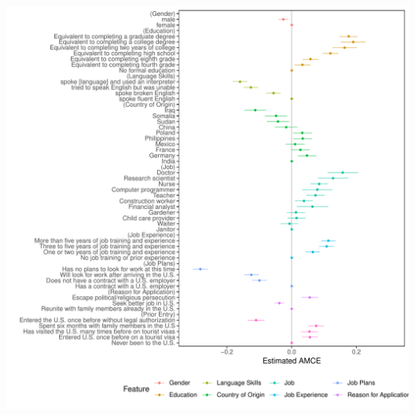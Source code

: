 \documentclass[a4paper,12pt]{article}\usepackage[]{graphicx}\usepackage[]{color}
\makeatletter
\def\maxwidth{ %
  \ifdim\Gin@nat@width>\linewidth
    \linewidth
  \else
    \Gin@nat@width
  \fi
}
\newenvironment{knitrout}{}{} %
\makeatother
\begin{document}
\begin{knitrout}
\color{fgcolor}
\includegraphics[width=\maxwidth]{figure/hainmueller_immigration_amce_appendix-1} 

\end{knitrout}

\clearpage
\end{document}
